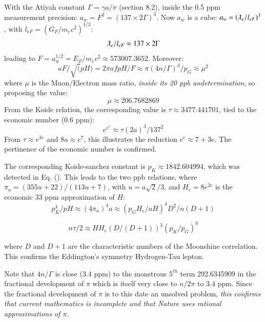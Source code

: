 \documentclass[twoside,draft]{article}
\begin{document}
\begin{sloppypar}
 With the Atiyah constant $\Gamma = \gamma a/\pi$ (section 8.2), inside the 0.5 ppm measurement precision:  
 $a_{w} = F^2 = (137 \times 2 \Gamma)^{3}$. Now $a_{w}$ is a cube: $a_{w} = (\lambdabar_{e}/l_{eF})^{3}$, with $l_{eF} = (G_{F}/m_{e} c^{2})^{1/3}$:    
\begin{equation}
\lambdabar_e/l_{eF} \approx 137 \times 2\Gamma
\end{equation}
leading to $F = a_{w}^{1/2} = E_{F} /m_{e} c^{2} \approx 573007.3652$. Moreover:
\begin{equation}
aF/\sqrt(pH) = 2\pi afpH/F \approx \pi(4n/\Gamma)^3/p_G \approx \mu^2
\end{equation}
where $\mu$ is the Muon/Electron mass ratio, \textit{inside its 20 ppb undetermination}, so proposing the value:
\begin{equation}
\mu \approx 206.7682869
\end{equation}
From the Koide relation, the corresponding value is $\tau \approx 3477.441701$, tied to the economic number (0.6 ppm):
\begin{equation}
e^{e^e} \approx \tau (2a)^3/137^2
\end{equation}
From $\tau \approx e^{3e}$ and $8a \approx e^7$, this illustrates the reduction $e^e \approx 7 + 3e$. The pertinence of the economic number is confirmed.  

The corresponding Koide-sanchez constant is $p_K \approx 1842.604994$, which was detected in Eq. (). This leads to the two ppb relations, where $\pi_a  = (355u+22)/(113u + 7)$, with $u = a\sqrt{2}/3$, and $H_e = 8 e^{2e}$ is the economic 33 ppm approximation of $H$:
\begin{equation}
p_K^4/pH \approx (4\pi_a)^4 a \approx (p_GH_e/aH)^4 D^2/n(D+1)
\end{equation}

\begin{equation}
n\tau/2 \approx HH_e(D/(D+1))^3 (p_K/p_G)^9
\end{equation}

where $D$ and $D+1$ are the characteristic numbers of the Moonshine correlation\cite{Conway}. This confirms the Eddington's symmetry Hydrogen-Tau lepton\cite{Eddington}.

Note that $4n/\Gamma$ is close (3.4 ppm) to the monstrous $5^{th}$ term 292.6345909 in
the fractional development of $\pi$ which is itself very close to $n/2\pi$ to 3.4 ppm. Since the fractional
development of $\pi$ is to this date an unsolved problem, \textit{this confirms that current mathematics is
incomplete and that Nature uses rational approximations of $\pi$}.


\end{sloppypar}
\end{document}
